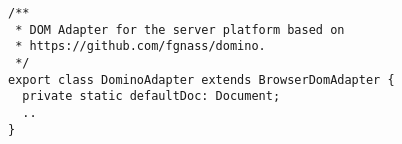 \begin{verbatim}
/**
 * DOM Adapter for the server platform based on
 * https://github.com/fgnass/domino.
 */
export class DominoAdapter extends BrowserDomAdapter {
  private static defaultDoc: Document;
  ..
}
\end{verbatim}
